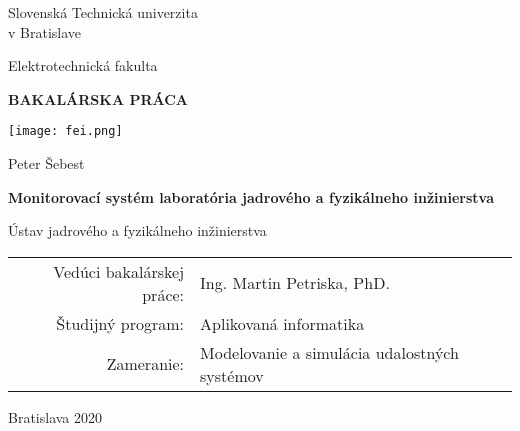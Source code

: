 

   \thispagestyle{empty} 
\pagestyle{empty}
\begin{center}
{\large Slovenská Technická univerzita \\ v Bratislave}

\medskip
{\large Elektrotechnická fakulta}

\vfill
{\bfseries\Large BAKALÁRSKA PRÁCA}

\vfill
\texttt{[image: fei.png]}

\vfill
\vspace{5mm}

{\LARGE Peter Šebest}

\vspace{15mm}

{\LARGE\bfseries Monitorovací systém laboratória jadrového a fyzikálneho inžinierstva}

\vfill

Ústav jadrového a fyzikálneho inžinierstva

\vfill

\begin{tabular}{rl}
Vedúci bakalárskej práce: & Ing. Martin Petriska, PhD. \\   
\noalign{\vspace{2mm}}
Študijný program: & Aplikovaná informatika\\
\noalign{\vspace{2mm}}
Zameranie: & Modelovanie a simulácia udalostných systémov\\

\end{tabular}

\vfill

Bratislava 2020

\end{center}

